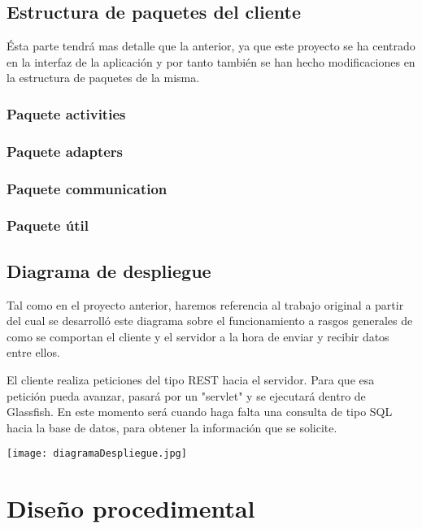 \subsection{Estructura de paquetes del cliente}

Ésta parte tendrá mas detalle que la anterior, ya que este proyecto se ha centrado en la interfaz de la aplicación y por tanto también se han hecho modificaciones en la estructura de paquetes de la misma.

\subsubsection{Paquete activities}

\subsubsection{Paquete adapters}

\subsubsection{Paquete communication}

\subsubsection{Paquete útil}

\subsection{Diagrama de despliegue}

Tal como en el proyecto anterior, haremos referencia al trabajo original a partir del cual se desarrolló este diagrama sobre el funcionamiento a rasgos generales de como se comportan el cliente y el servidor a la hora de enviar y recibir datos entre ellos.

El cliente realiza peticiones del tipo REST hacia el servidor. Para que esa petición pueda avanzar, pasará por un "servlet" y se ejecutará dentro de Glassfish. En este momento será cuando haga falta una consulta de tipo SQL hacia la base de datos, para obtener la información que se solicite.

\texttt{[image: diagramaDespliegue.jpg]}


\section{Diseño procedimental}


